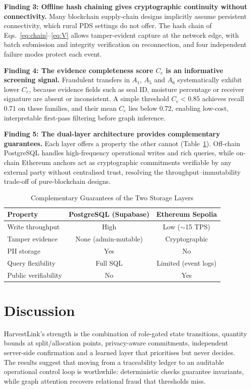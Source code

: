 \documentclass[conference,a4paper]{IEEEtran}
\begin{document}
\textbf{Finding 3: Offline hash chaining gives cryptographic continuity without connectivity.} Many blockchain supply-chain designs implicitly assume persistent connectivity, which rural PDS settings do not offer. The hash chain of Eqs.~\eqref{eq:chain}--\eqref{eq:V} allows tamper-evident capture at the network edge, with batch submission and integrity verification on reconnection, and four independent failure modes protect each event.

\textbf{Finding 4: The evidence completeness score $C_e$ is an informative screening signal.} Fraudulent transfers in $A_1$, $A_5$ and $A_6$ systematically exhibit lower $C_e$, because evidence fields such as seal ID, moisture percentage or receiver signature are absent or inconsistent. A simple threshold $C_e<0.85$ achieves recall 0.71 on these families, and their mean $C_e$ lies below 0.72, enabling low-cost, interpretable first-pass filtering before graph inference.

\textbf{Finding 5: The dual-layer architecture provides complementary guarantees.} Each layer offers a property the other cannot (Table~\ref{tab:dual}). Off-chain PostgreSQL handles high-frequency operational writes and rich queries, while on-chain Ethereum anchors act as cryptographic commitments verifiable by any external party without centralised trust, resolving the throughput--immutability trade-off of pure-blockchain designs.

\begin{table}[!t]
\caption{Complementary Guarantees of the Two Storage Layers}
\label{tab:dual}
\centering\footnotesize
\begin{tabular}{@{}l c c@{}}
\toprule
Property & PostgreSQL (Supabase) & Ethereum Sepolia\\
\midrule
Write throughput & High & Low ($\sim$15 TPS)\\
Tamper evidence & None (admin-mutable) & Cryptographic\\
PII storage & Yes & No\\
Query flexibility & Full SQL & Limited (event logs)\\
Public verifiability & No & Yes\\
\bottomrule
\end{tabular}
\end{table}

\section{Discussion}
HarvestLink's strength is the combination of role-gated state transitions, quantity bounds at split/allocation points, privacy-aware commitments, independent server-side confirmation and a learned layer that prioritises but never decides. The results suggest that moving from a traceability ledger to an auditable operational control loop is worthwhile: deterministic checks guarantee invariants, while graph attention recovers relational fraud that thresholds miss.
\end{document}

